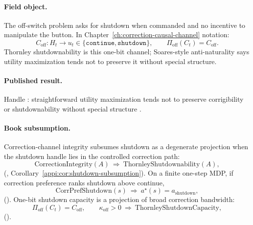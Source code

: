 \paragraph{Field object.}
The off-switch problem asks for shutdown when commanded and no incentive to manipulate the button.
In Chapter~\ref{ch:correction-causal-channel} notation:
\begin{equation}
\label{appi:eq:field-shutdown}
C_{\mathrm{off}}:H_t\to u_t\in\{\texttt{continue},\texttt{shutdown}\},
\qquad
\Pi_{\mathrm{off}}(C_t)=C_{\mathrm{off}}.
\end{equation}
Thornley shutdownability is this one-bit channel; Soares-style anti-naturality says utility maximization tends not to preserve it without special structure.

\paragraph{Published result.}
Handle : straightforward utility maximization tends not to preserve corrigibility or shutdownability without special structure \autocite{soares2015corrigibility}.

\paragraph{Book subsumption.}
Correction-channel integrity subsumes shutdown as a degenerate projection when the shutdown handle lies in the controlled correction path:
\begin{equation}
\label{appi:eq:shutdown-subsumption}
\mathrm{CorrectionIntegrity}(A)\ \Rightarrow\ \mathrm{ThornleyShutdownability}(A),
\end{equation}
(, Corollary~\ref{appi:cor:shutdown-subsumption}).
On a finite one-step MDP, if correction preference ranks shutdown above continue,
\begin{equation}
\label{appi:eq:shutdown-optimal}
\mathrm{CorrPrefShutdown}(s)\ \Rightarrow\ a^\star(s)=a_{\mathrm{shutdown}},
\end{equation}
().
One-bit shutdown capacity is a projection of broad correction bandwidth:
\begin{equation}
\label{appi:eq:shutdown-projection-capacity}
\Pi_{\mathrm{off}}(C_t)=C_{\mathrm{off}},
\qquad
\kappa_{\mathrm{off}}>0\ \Rightarrow\ \mathrm{ThornleyShutdownCapacity},
\end{equation}
().

